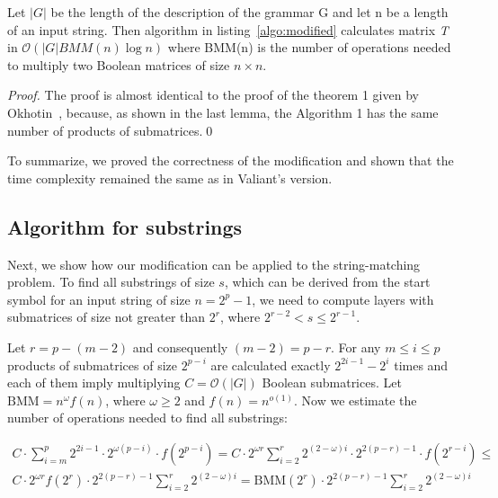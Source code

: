 \begin{theorem}
Let $|G|$ be the length of the description of the grammar G and let n be a length of an input string. Then algorithm in listing~\ref{algo:modified} calculates matrix \textit{T} in $\mathcal{O}(|G|BMM(n)\log{n})$ where BMM(n) is the number of operations needed to multiply two Boolean matrices of size $n \times n$.
\end{theorem}

\begin{proof}
The proof is almost identical to the proof of the theorem 1 given by Okhotin~\cite{Okhotin:2014:PMM:2565359.2565379}, because, as shown in the last lemma, the Algorithm 1 has the same number of products of submatrices.\qed
\end{proof}

To summarize, we proved the correctness of the modification and shown that the time complexity remained the same as in Valiant's version.


\subsection{Algorithm for substrings}

Next, we show how our modification can be applied to the string-matching problem.
To find all substrings of size $s$, which can be derived from the start symbol for an input string of size $n = 2^p - 1$, we need to compute layers with submatrices of size not greater than $2^{r}$, where $2^{r - 2} < s \le 2^{r - 1}$.

Let $r = p - (m - 2)$ and consequently $(m - 2) = p - r$.
For any  $m \le i \le p$ products of submatrices of size $2^{p - i}$ are calculated exactly $2^{2i - 1} - 2^{i}$ times and each of them imply multiplying $C = \mathcal{O}(|G|)$ Boolean submatrices. Let $\mathrm{BMM} = n^\omega f(n)$, where $\omega \geq 2$ and $f(n) = n^{o(1)}$.
Now we estimate the number of operations needed to find all substrings:

\begin{equation*}
\begin{array}{c}
C \cdot \sum\limits_{i=m}^p 2^{2i - 1} \cdot 2^{\omega(p - i)} \cdot f(2^{p - i}) =
C \cdot 2^{\omega r}\sum\limits_{i=2}^{r} 2^{(2 - \omega)i} \cdot 2^{2(p - r) - 1} \cdot f(2^{r - i}) \le \\
C \cdot 2^{\omega r} f(2^{r}) \cdot 2^{2(p - r) - 1} \sum\limits_{i=2}^{r} 2^{(2 - \omega)i} =
\mathrm{BMM}(2^{r}) \cdot 2^{2(p - r) - 1} \sum\limits_{i=2}^{r} 2^{(2 - \omega)i}
\end{array}
\end{equation*}

